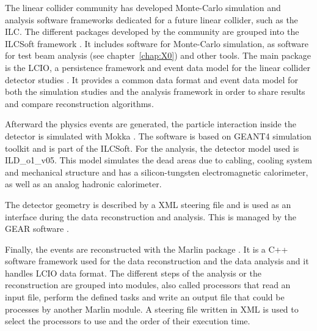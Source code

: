     The linear collider community has developed Monte-Carlo simulation and analysis software frameworks dedicated for a future linear collider, such as the \gls{ILC}. 
    The different packages developed by the community are grouped into the ILCSoft framework \cite{ilcsoft}.
    It includes software for Monte-Carlo simulation, as software for test beam analysis (see chapter~\ref{chap:X0}) and other tools.
    The main package is the \gls{LCIO}, a persistence framework and event data model for the linear collider detector studies \cite{lcio}. 
    It provides a common data format and event data model for both the simulation studies and the analysis framework in order to share results and compare reconstruction algorithms.


    Afterward the physics events are generated, the particle interaction inside the detector is simulated with Mokka \cite{Mokka}.
    The software is based on GEANT4 simulation toolkit \cite{GEANT4} and is part of the ILCSoft.
    For the analysis, the detector model used is ILD\_o1\_v05.
    This model simulates the dead areas due to cabling, cooling system and mechanical structure and has a silicon-tungsten electromagnetic calorimeter, as well as an analog hadronic calorimeter.
    
    The detector geometry is described by a XML steering file and is used as an interface during the data reconstruction and analysis.
    This is managed by the \gls{GEAR} software \cite{GEAR}.

    Finally, the events are reconstructed with the \gls{Marlin} package \cite{MARLIN}.
    It is a C++ software framework used for the data reconstruction and the data analysis and it handles \gls{LCIO} data format.
    The different steps of the analysis or the reconstruction are grouped into modules, also called processors that read an input file, perform the defined tasks and write an output file that could be processes by another \gls{Marlin} module.
    A steering file written in XML is used to select the processors to use and the order of their execution time.

